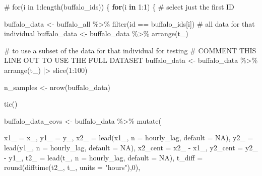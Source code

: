 \documentclass[
  letterpaper,
  DIV=11,
  numbers=noendperiod]{scrartcl}
\newenvironment{Shaded}{\begin{snugshade}}{\end{snugshade}}
\newcommand{\AttributeTok}[1]{\textcolor[rgb]{0.40,0.45,0.13}{#1}}
\newcommand{\CommentTok}[1]{\textcolor[rgb]{0.37,0.37,0.37}{#1}}
\newcommand{\ConstantTok}[1]{\textcolor[rgb]{0.56,0.35,0.01}{#1}}
\newcommand{\ControlFlowTok}[1]{\textcolor[rgb]{0.00,0.23,0.31}{\textbf{#1}}}
\newcommand{\DecValTok}[1]{\textcolor[rgb]{0.68,0.00,0.00}{#1}}
\newcommand{\FunctionTok}[1]{\textcolor[rgb]{0.28,0.35,0.67}{#1}}
\newcommand{\NormalTok}[1]{\textcolor[rgb]{0.00,0.23,0.31}{#1}}
\newcommand{\OtherTok}[1]{\textcolor[rgb]{0.00,0.23,0.31}{#1}}
\newcommand{\SpecialCharTok}[1]{\textcolor[rgb]{0.37,0.37,0.37}{#1}}
\newcommand{\StringTok}[1]{\textcolor[rgb]{0.13,0.47,0.30}{#1}}
\begin{document}
\begin{Shaded}
\begin{Highlighting}[]
\CommentTok{\# for(i in 1:length(buffalo\_ids)) \{}
\ControlFlowTok{for}\NormalTok{(i }\ControlFlowTok{in} \DecValTok{1}\SpecialCharTok{:}\DecValTok{1}\NormalTok{) \{ }\CommentTok{\# select just the first ID}

\NormalTok{  buffalo\_data }\OtherTok{\textless{}{-}}\NormalTok{ buffalo\_all }\SpecialCharTok{\%\textgreater{}\%} \FunctionTok{filter}\NormalTok{(id }\SpecialCharTok{==}\NormalTok{ buffalo\_ids[i])}
  \CommentTok{\# all data for that individual}
\NormalTok{  buffalo\_data }\OtherTok{\textless{}{-}}\NormalTok{ buffalo\_data }\SpecialCharTok{\%\textgreater{}\%} \FunctionTok{arrange}\NormalTok{(t\_)}
  
  \CommentTok{\# to use a subset of the data for that individual for testing}
  \CommentTok{\# COMMENT THIS LINE OUT TO USE THE FULL DATASET}
\NormalTok{  buffalo\_data }\OtherTok{\textless{}{-}}\NormalTok{ buffalo\_data }\SpecialCharTok{\%\textgreater{}\%} \FunctionTok{arrange}\NormalTok{(t\_) }\SpecialCharTok{|\textgreater{}}  \FunctionTok{slice}\NormalTok{(}\DecValTok{1}\SpecialCharTok{:}\DecValTok{100}\NormalTok{)}

\NormalTok{  n\_samples }\OtherTok{\textless{}{-}} \FunctionTok{nrow}\NormalTok{(buffalo\_data)}
  
  \FunctionTok{tic}\NormalTok{()}
  
\NormalTok{  buffalo\_data\_covs }\OtherTok{\textless{}{-}}\NormalTok{ buffalo\_data }\SpecialCharTok{\%\textgreater{}\%} \FunctionTok{mutate}\NormalTok{(}
    
    \AttributeTok{x1\_ =}\NormalTok{ x\_,}
    \AttributeTok{y1\_ =}\NormalTok{ y\_,}
    \AttributeTok{x2\_ =} \FunctionTok{lead}\NormalTok{(x1\_, }\AttributeTok{n =}\NormalTok{ hourly\_lag, }\AttributeTok{default =} \ConstantTok{NA}\NormalTok{),}
    \AttributeTok{y2\_ =} \FunctionTok{lead}\NormalTok{(y1\_, }\AttributeTok{n =}\NormalTok{ hourly\_lag, }\AttributeTok{default =} \ConstantTok{NA}\NormalTok{),}
    \AttributeTok{x2\_cent =}\NormalTok{ x2\_ }\SpecialCharTok{{-}}\NormalTok{ x1\_,}
    \AttributeTok{y2\_cent =}\NormalTok{ y2\_ }\SpecialCharTok{{-}}\NormalTok{ y1\_,}
    \AttributeTok{t2\_ =} \FunctionTok{lead}\NormalTok{(t\_, }\AttributeTok{n =}\NormalTok{ hourly\_lag, }\AttributeTok{default =} \ConstantTok{NA}\NormalTok{),}
    \AttributeTok{t\_diff =} \FunctionTok{round}\NormalTok{(}\FunctionTok{difftime}\NormalTok{(t2\_, t\_, }\AttributeTok{units =} \StringTok{"hours"}\NormalTok{),}\DecValTok{0}\NormalTok{),}
    

\end{Highlighting}
\end{Shaded}
\end{document}

